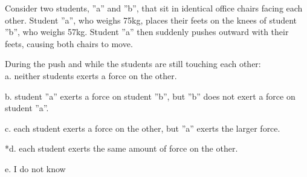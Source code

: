 
Consider two students, ''a'' and ''b'', that sit in identical office chairs facing each other. Student ''a'', who weighs 75kg, places their feets on the knees of student ''b'', who weighs 57kg. Student ''a'' then suddenly pushes outward with their feets, causing both chairs to move. 

During the push and while the students are still touching each other: \\

a. neither students exerts a force on the other.

b. student ''a'' exerts a force on student ''b'', but ''b'' does not exert a force on student ''a''.

c. each student exerts a force on the other, but ''a'' exerts the larger force.

*d. each student exerts the same amount of force on the other.

e. I do not know \\

